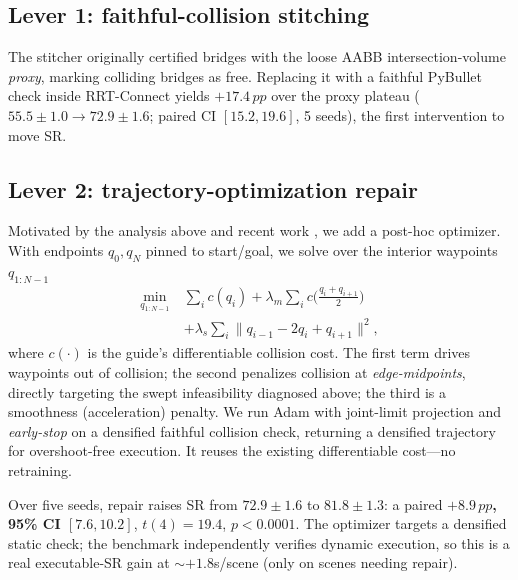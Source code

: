 \documentclass[10pt,twocolumn]{article}
\newcommand{\pp}{\,pp}
\begin{document}
\subsection{Lever 1: faithful-collision stitching}
The stitcher originally certified bridges with the loose AABB intersection-volume
\emph{proxy}, marking colliding bridges as free. Replacing it with a faithful
PyBullet check inside RRT-Connect yields \textbf{$+17.4\pp$} over the proxy plateau
($55.5{\pm}1.0\!\to\!72.9{\pm}1.6$; paired CI $[15.2,19.6]$, 5 seeds), the first
intervention to move SR.

\subsection{Lever 2: trajectory-optimization repair}
\label{sec:repair}
Motivated by the analysis above and recent work \cite{presto2025,mpd2023}, we add a
post-hoc optimizer. With endpoints $q_0,q_N$ pinned to start/goal, we solve over
the interior waypoints $q_{1:N-1}$
\begin{equation}
\begin{aligned}
\min_{q_{1:N-1}}\ &\textstyle\sum_{i} c(q_i)
  + \lambda_m \sum_i c\big(\tfrac{q_i+q_{i+1}}{2}\big)\\[-1pt]
  &\textstyle + \lambda_s \sum_i \lVert q_{i-1}-2q_i+q_{i+1}\rVert^2,
\end{aligned}
\label{eq:repair}
\end{equation}
where $c(\cdot)$ is the guide's differentiable collision cost. The first term
drives waypoints out of collision; the second penalizes collision at
\emph{edge-midpoints}, directly targeting the swept infeasibility diagnosed above;
the third is a smoothness (acceleration) penalty. We run Adam with joint-limit
projection and \emph{early-stop} on a densified faithful collision check, returning
a densified trajectory for overshoot-free execution. It reuses the existing
differentiable cost---no retraining.

Over five seeds, repair raises SR from $72.9{\pm}1.6$ to $81.8{\pm}1.3$: a paired
\textbf{$+8.9\pp$, 95\% CI $[7.6,10.2]$}, $t(4){=}19.4$, $p{<}0.0001$. The
optimizer targets a densified static check; the benchmark independently verifies
dynamic execution, so this is a real executable-SR gain at $\sim$$+1.8$s/scene
(only on scenes needing repair).
\end{document}
